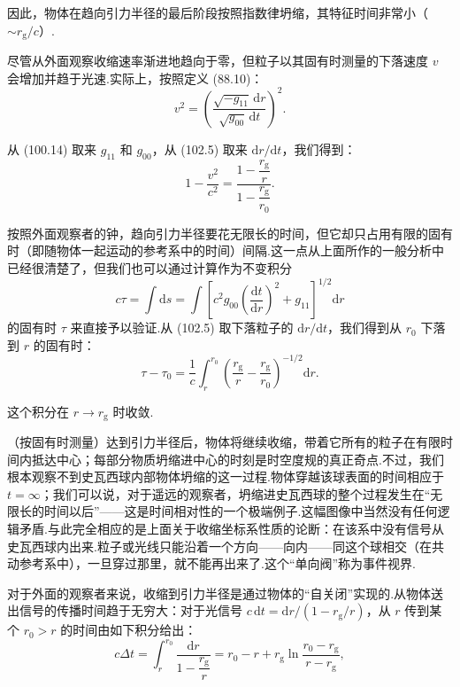 因此，物体在趋向引力半径的最后阶段按照指数律坍缩，其特征时间非常小（$\sim r_{\mathrm{g}}/c$）.

尽管从外面观察收缩速率渐进地趋向于零，但粒子以其固有时测量的下落速度 $v$ 会增加并趋于光速.实际上，按照定义 (88.10)：
\begin{equation*}
  v^{2}=\left(\frac{\sqrt{-g_{11}}\,\mathrm{d}r}
  {\sqrt{g_{00}}\,\mathrm{d}t}\right)^{2}.
\end{equation*}

从 (100.14) 取来 $g_{11}$ 和 $g_{00}$，从 (102.5) 取来 $\mathrm{d}r/\mathrm{d}t$，我们得到：
\begin{equation}
  1-\frac{v^{2}}{c^{2}}
  =\frac{1-\dfrac{r_{\mathrm{g}}}{r}}{1-\dfrac{r_{\mathrm{g}}}{r_0}}.
\end{equation}

按照外面观察者的钟，趋向引力半径要花无限长的时间，但它却只占用有限的固有时（即随物体一起运动的参考系中的时间）间隔.这一点从上面所作的一般分析中已经很清楚了，但我们也可以通过计算作为不变积分
\begin{equation*}
  c\tau=\int\mathrm{d}s
  =\int\left[c^{2}g_{00}\left(\frac{\mathrm{d}t}{\mathrm{d}r}\right)^{2}
  +g_{11}\right]^{1/2}\mathrm{d}r
\end{equation*}
的固有时 $\tau$ 来直接予以验证.从 (102.5) 取下落粒子的 $\mathrm{d}r/\mathrm{d}t$，我们得到从 $r_0$ 下落到 $r$ 的固有时：
\begin{equation}
  \tau-\tau_0=\frac{1}{c}\int_{r}^{r_0}
  \left(\frac{r_{\mathrm{g}}}{r}-\frac{r_{\mathrm{g}}}{r_0}\right)^{-1/2}
  \mathrm{d}r.
\end{equation}

这个积分在 $r\to r_{\mathrm{g}}$ 时收敛.

（按固有时测量）达到引力半径后，物体将继续收缩，带着它所有的粒子在有限时间内抵达中心；每部分物质坍缩进中心的时刻是时空度规的真正奇点.不过，我们根本观察不到史瓦西球内部物体坍缩的这一过程.物体穿越该球表面的时间相应于 $t=\infty$；我们可以说，对于遥远的观察者，坍缩进史瓦西球的整个过程发生在“无限长的时间以后”——这是时间相对性的一个极端例子.这幅图像中当然没有任何逻辑矛盾.与此完全相应的是上面关于收缩坐标系性质的论断：在该系中没有信号从史瓦西球内出来.粒子或光线只能沿着一个方向——向内——同这个球相交（在共动参考系中），一旦穿过那里，就不能再出来了.这个“单向阀”称为事件视界.

对于外面的观察者来说，收缩到引力半径是通过物体的“自关闭”实现的.从物体送出信号的传播时间趋于无穷大：对于光信号 $c\,\mathrm{d}t=\mathrm{d}r/(1-r_{\mathrm{g}}/r)$，从 $r$ 传到某个 $r_0>r$ 的时间由如下积分给出：
\begin{equation}
  c\Delta t=\int_{r}^{r_0}\frac{\mathrm{d}r}{1-\dfrac{r_{\mathrm{g}}}{r}}
  =r_0-r+r_{\mathrm{g}}\ln\frac{r_0-r_{\mathrm{g}}}{r-r_{\mathrm{g}}},
\end{equation}

